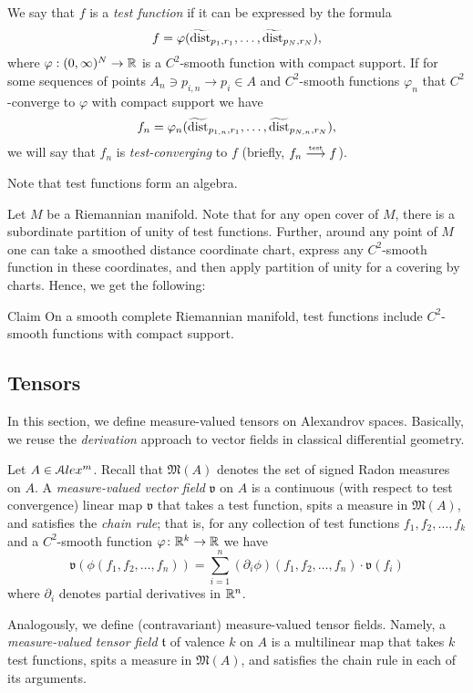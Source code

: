 We say that $f$ is a \emph{test function} if it can be expressed by the formula
$$f=\varphi( \widetilde{\operatorname{\rm dist}}_{p_1,r_1}, \dots,   \widetilde{\operatorname{\rm dist}}_{p_N,r_N}),$$
where $\varphi:(0,\infty)^N\to\mathbb{R}$ is a $C^2$-smooth function with compact support.
If for some sequences of points $A_n\ni p_{i,n}\to p_i\in A$ and $C^2$-smooth functions $\varphi_n$ that $C^2$-converge to $\varphi$ with compact support we have
$$f_n=\varphi_n( \widetilde{\operatorname{\rm dist}}_{p_{1,n},r_1},\dots,   \widetilde{\operatorname{\rm dist}}_{p_{N,n},r_N}),$$
we will say that $f_n$ is \emph{test-converging} to $f$ (briefly, $f_n\stackrel{\text{\tiny\rm test}}{\longrightarrow} f$).

Note that test functions form an algebra.

Let $M$ be a Riemannian manifold.
Note that for any open cover of $M$, there is a subordinate partition of unity of test functions.
Further, around any point of $M$ one can take a smoothed distance 
coordinate chart, express any $C^2$-smooth function in these 
coordinates, and then apply partition of unity for a covering by charts.
Hence, we get the following:

\begin{thm}{Claim}
On a smooth complete Riemannian manifold, test functions
include $C^2$-smooth functions with compact support.
\end{thm}
 
\subsection{Tensors}

In this section, we define measure-valued tensors on Alexandrov spaces.
Basically, we reuse the \emph{derivation} approach to vector fields in classical differential geometry. 

Let $A\in \mathcal{A}lex^m$.
Recall that $\mathfrak M(A)$
denotes the set of signed Radon measures on $A$.
A \emph{measure-valued vector field} $\mathfrak{v}$  on $A$
is a  continuous (with respect to test convergence) linear map
$\mathfrak{v}$ that takes a test function,
spits a measure in $\mathfrak M(A)$,
and satisfies the \emph{chain rule};
that is, for any collection of test functions $f_1,f_2,\dots,f_k$
and a $C^2$-smooth function $\varphi\colon\mathbb{R}^k\to\mathbb{R}$ we have
$$\mathfrak{v}(\phi(f_1,f_2,\dots,f_n))
=
\sum_{i=1}^n (\partial_i\phi)(f_1,f_2,\dots,f_n)\cdot\mathfrak{v}(f_i)$$
where $\partial_i$ denotes partial derivatives in $\mathbb{R}^n$.

Analogously, we define (contravariant) measure-valued tensor fields.
Namely, a \emph{measure-valued tensor field} $\mathfrak{t}$ of valence $k$ on $A$ is a multilinear map that takes $k$ test functions, spits a measure in $\mathfrak M(A)$, and satisfies the chain rule in each of its arguments.

